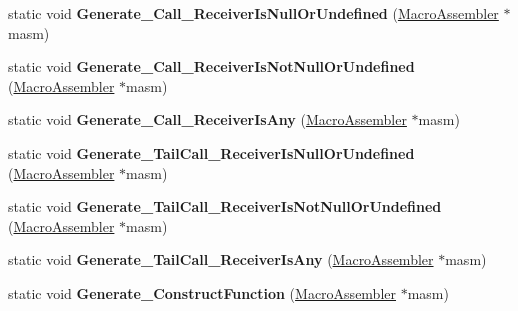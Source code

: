 \begin{DoxyCompactItemize}
\item 
static void {\bfseries Generate\+\_\+\+Call\+\_\+\+Receiver\+Is\+Null\+Or\+Undefined} (\hyperlink{classv8_1_1internal_1_1_macro_assembler}{Macro\+Assembler} $\ast$masm)\hypertarget{classv8_1_1internal_1_1_builtins_a7f8fdd5fde6126c0a1fabc89e5b73050}{}\label{classv8_1_1internal_1_1_builtins_a7f8fdd5fde6126c0a1fabc89e5b73050}

\item 
static void {\bfseries Generate\+\_\+\+Call\+\_\+\+Receiver\+Is\+Not\+Null\+Or\+Undefined} (\hyperlink{classv8_1_1internal_1_1_macro_assembler}{Macro\+Assembler} $\ast$masm)\hypertarget{classv8_1_1internal_1_1_builtins_a0b7c50e040c5ce790514534cf789bc24}{}\label{classv8_1_1internal_1_1_builtins_a0b7c50e040c5ce790514534cf789bc24}

\item 
static void {\bfseries Generate\+\_\+\+Call\+\_\+\+Receiver\+Is\+Any} (\hyperlink{classv8_1_1internal_1_1_macro_assembler}{Macro\+Assembler} $\ast$masm)\hypertarget{classv8_1_1internal_1_1_builtins_a420c6586a0bb06f8d2afbb859df6bf5f}{}\label{classv8_1_1internal_1_1_builtins_a420c6586a0bb06f8d2afbb859df6bf5f}

\item 
static void {\bfseries Generate\+\_\+\+Tail\+Call\+\_\+\+Receiver\+Is\+Null\+Or\+Undefined} (\hyperlink{classv8_1_1internal_1_1_macro_assembler}{Macro\+Assembler} $\ast$masm)\hypertarget{classv8_1_1internal_1_1_builtins_a12df56bb44f8f6162b50e7b8136defb1}{}\label{classv8_1_1internal_1_1_builtins_a12df56bb44f8f6162b50e7b8136defb1}

\item 
static void {\bfseries Generate\+\_\+\+Tail\+Call\+\_\+\+Receiver\+Is\+Not\+Null\+Or\+Undefined} (\hyperlink{classv8_1_1internal_1_1_macro_assembler}{Macro\+Assembler} $\ast$masm)\hypertarget{classv8_1_1internal_1_1_builtins_ac18aa3b3b2ffb89946922d792e95a277}{}\label{classv8_1_1internal_1_1_builtins_ac18aa3b3b2ffb89946922d792e95a277}

\item 
static void {\bfseries Generate\+\_\+\+Tail\+Call\+\_\+\+Receiver\+Is\+Any} (\hyperlink{classv8_1_1internal_1_1_macro_assembler}{Macro\+Assembler} $\ast$masm)\hypertarget{classv8_1_1internal_1_1_builtins_a9775511cc1dad3336aa25199dd99b06b}{}\label{classv8_1_1internal_1_1_builtins_a9775511cc1dad3336aa25199dd99b06b}

\item 
static void {\bfseries Generate\+\_\+\+Construct\+Function} (\hyperlink{classv8_1_1internal_1_1_macro_assembler}{Macro\+Assembler} $\ast$masm)\hypertarget{classv8_1_1internal_1_1_builtins_a9e510d54b5265898f2127affa5d79f0e}{}\label{classv8_1_1internal_1_1_builtins_a9e510d54b5265898f2127affa5d79f0e}


\end{DoxyCompactItemize}
